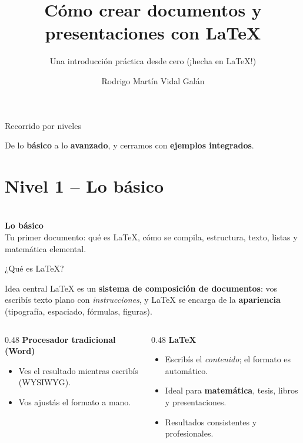 \documentclass[10pt,aspectratio=169]{beamer}
\title[LaTeX y Beamer]{Cómo crear documentos y presentaciones con LaTeX}
\subtitle{Una introducción práctica desde cero (¡hecha en LaTeX!)}
\author{Rodrigo Martín Vidal Galán}
\institute{}
\date{}
\newcommand{\nivel}[3]{%
  \begin{frame}[plain]
    \centering\vfill
    {\small\structure{#1}}\\[8pt]
    {\Large\textbf{#2}}\\[12pt]
    {\normalsize #3}
    \vfill
  \end{frame}}
\begin{document}
{
\begin{frame}[plain]
  \titlepage
\end{frame}
}

\begin{frame}{Recorrido por niveles}
  \tableofcontents
  \vfill
  \begin{center}\small De lo \textbf{básico} a lo \textbf{avanzado}, y cerramos con \textbf{ejemplos integrados}.\end{center}
\end{frame}

\section{Nivel 1 -- Lo básico}
\nivel{NIVEL 1}{Lo básico}{Tu primer documento: qué es LaTeX, cómo se compila, estructura, texto, listas y matemática elemental.}

\begin{frame}{¿Qué es LaTeX?}
  \begin{block}{Idea central}
    LaTeX es un \textbf{sistema de composición de documentos}: vos escribís
    texto plano con \emph{instrucciones}, y LaTeX se encarga de la
    \textbf{apariencia} (tipografía, espaciado, fórmulas, figuras).
  \end{block}
  \begin{columns}[T]
    \begin{column}{0.48\textwidth}
      \textbf{Procesador tradicional (Word)}
      \begin{itemize}
        \item Ves el resultado mientras escribís (WYSIWYG).
        \item Vos ajustás el formato a mano.
      \end{itemize}
    \end{column}
    \hspace{0.04\textwidth}
    \begin{column}{0.48\textwidth}
      \textbf{LaTeX}
      \begin{itemize}
        \item Escribís el \emph{contenido}; el formato es automático.
        \item Ideal para \textbf{matemática}, tesis, libros y presentaciones.
        \item Resultados consistentes y profesionales.
      \end{itemize}
    \end{column}
  \end{columns}
\end{frame}
\end{document}

